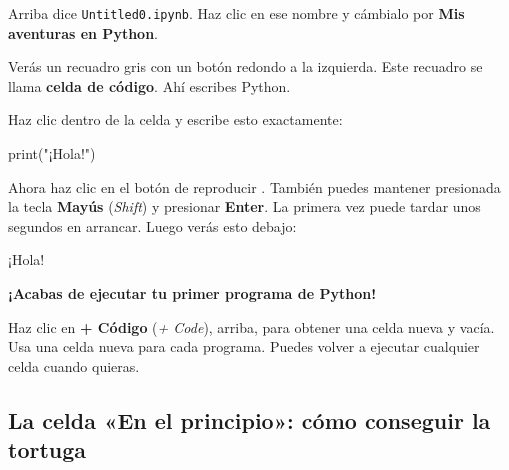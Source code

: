 Arriba dice \texttt{Untitled0.ipynb}. Haz clic en ese nombre y cámbialo por \textbf{Mis aventuras en Python}.

Verás un recuadro gris con un botón redondo a la izquierda. Este recuadro se llama \textbf{celda de código}. Ahí escribes Python.

\begin{center}
\end{center}

Haz clic dentro de la celda y escribe esto exactamente:

\begin{typethis}
print("¡Hola!")
\end{typethis}

Ahora haz clic en el botón de reproducir \playbtn. También puedes mantener presionada la tecla \textbf{Mayús} (\textit{Shift}) y presionar \textbf{Enter}. La primera vez puede tardar unos segundos en arrancar. Luego verás esto debajo:

\begin{outputbox}
¡Hola!
\end{outputbox}

\textbf{¡Acabas de ejecutar tu primer programa de Python!}

Haz clic en \textbf{+ Código} (\textit{+ Code}), arriba, para obtener una celda nueva y vacía. Usa una celda nueva para cada programa. Puedes volver a ejecutar cualquier celda cuando quieras.

\subsection*{La celda «En el principio»: cómo conseguir la tortuga}

